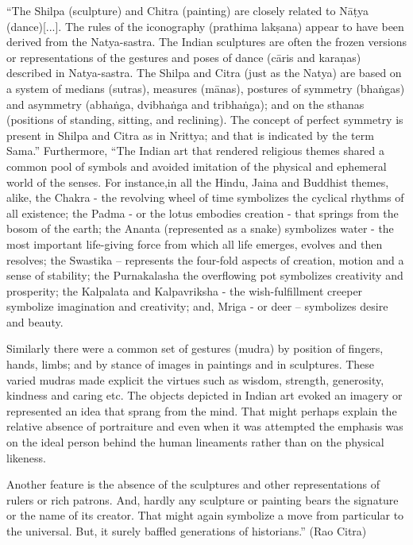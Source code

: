 \begin{myquote}
“The Shilpa (sculpture) and Chitra (painting) are closely related to Nāṭya (dance)[...]. The rules of the iconography (prathima lakṣana) appear to have been derived from the Natya-sastra. The Indian sculptures are often the frozen versions or representations of the gestures and poses of dance (cāris and karaṇas) described in Natya-sastra. The Shilpa and Citra (just as the Natya) are based on a system of medians (sutras), measures (mānas), postures of symmetry (bhaṅgas) and asymmetry (abhaṅga, dvibhaṅga and tribhaṅga); and on the sthanas (positions of standing, sitting, and reclining). The concept of perfect symmetry is present in Shilpa and Citra as in Nrittya; and that is indicated by the term Sama.” Furthermore, “The Indian art that rendered religious themes shared a common pool of symbols and avoided imitation of the physical and ephemeral world of the senses. For instance,in all the Hindu, Jaina and Buddhist themes, alike, the Chakra - the revolving wheel of time symbolizes the cyclical rhythms of all existence; the Padma - or the lotus embodies creation - that springs from the bosom of the earth; the Ananta (represented as a snake) symbolizes water - the most important life-giving force from which all life emerges, evolves and then resolves; the Swastika – represents the four-fold aspects of creation, motion and a sense of stability; the Purnakalasha the overflowing pot symbolizes creativity and prosperity; the Kalpalata and Kalpavriksha - the wish-fulfillment creeper symbolize imagination and creativity; and, Mriga - or deer – symbolizes desire and beauty.

Similarly there were a common set of gestures (mudra) by position of fingers, hands, limbs; and by stance of images in paintings and in sculptures. These varied mudras made explicit the virtues such as wisdom, strength, generosity, kindness and caring etc. The objects depicted in Indian art evoked an imagery or represented an idea that sprang from the mind. That might perhaps explain the relative absence of portraiture and even when it was attempted the emphasis was on the ideal person behind the human lineaments rather than on the physical likeness.

Another feature is the absence of the sculptures and other representations of rulers or rich patrons. And, hardly any sculpture or painting bears the signature or the name of its creator. That might again symbolize a move from particular to the universal. But, it surely baffled generations of historians.” (Rao Citra)
\end{myquote}

